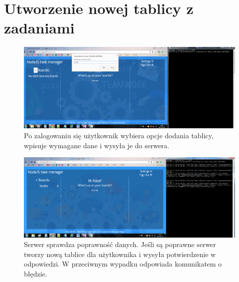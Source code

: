 \documentclass[12pt]{report}
\begin{document}
\section{Utworzenie nowej tablicy z zadaniami}
\begin{figure}[!hb]
\centering
\includegraphics[width=\textwidth,height=\textheight,keepaspectratio]{71.png}
\captionsetup{labelformat=empty}
\caption[]{Po zalogowaniu się użytkownik wybiera opcje dodania tablicy, wpisuje wymagane dane i wysyła je do serwera.}
\end{figure}
\begin{figure}[!hb]
\centering
\includegraphics[width=\textwidth,height=\textheight,keepaspectratio]{72.png}
\captionsetup{labelformat=empty}
\caption[]{Serwer sprawdza poprawność danych. 
Jeśli są poprawne serwer tworzy nową tablice dla użytkownika i wysyła potwierdzenie w odpowiedzi.
W przeciwnym wypadku odpowiada komunikatem o błędzie.}
\end{figure}
\end{document}

